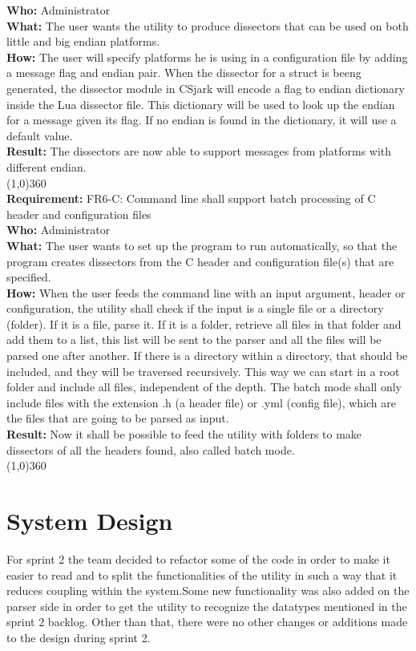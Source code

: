 \textbf{Who:} Administrator\\
\textbf{What:} The user wants the utility to produce dissectors that can be used on both little and big endian platforms.\\
\textbf{How:} The user will specify platforms he is using in a configuration file by adding a message flag and endian pair. When the dissector for a struct is beeng generated, the dissector module in CSjark will encode a flag to endian dictionary inside the Lua dissector file. This dictionary will be used to look up the endian for a message given its flag. If no endian is found in the dictionary, it will use a default value.\\
\textbf{Result:} The dissectors are now able to support messages from platforms with different endian.\\
\line(1,0){360}\\
\textbf{Requirement:} FR6-C: Command line shall support batch processing of C header and configuration files\\
\textbf{Who:} Administrator\\
\textbf{What:} The user wants to set up the program to run automatically, so that the program creates dissectors from the C header and configuration file(s) that are specified.\\
\textbf{How:} When the user feeds the command line with an input argument, header or configuration, the utility shall check if the input is a single file or a directory (folder). If it is a file, parse it. If it is a folder, retrieve all files in that folder and add them to a list, this list will be sent to the parser and all the files will be parsed one after another. If there is a directory within a directory, that should be included, and they will be traversed recursively. This way we can start in a root folder and include all files, independent of the depth. The batch mode shall only include files with the extension .h (a header file) or .yml (config file), which are the files that are going to be parsed as input.\\
\textbf{Result:} Now it shall be possible to feed the utility with folders to make dissectors of all the headers found, also called batch mode.\\
\line(1,0){360}\\	


\section{System Design}
For sprint 2 the team decided to refactor some of the code in order to make it easier to read and to split the functionalities of the utility in such a way that it reduces coupling within the system.Some new functionality was also added on the parser side in order to get the utility to recognize the datatypes mentioned in the sprint 2 backlog. Other than that, there were no other changes or additions made to the design during sprint 2.

